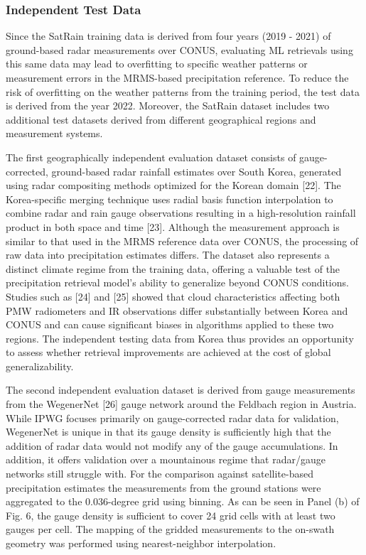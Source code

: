 \documentclass[11pt]{article}
\begin{document}
\subsubsection{Independent Test Data}

Since the SatRain training data is derived from four years (2019 - 2021) of ground-based radar measurements over CONUS, evaluating ML retrievals using this same data may lead to overfitting to specific weather patterns or measurement errors in the MRMS-based precipitation reference. To reduce the risk of overfitting on the weather patterns from the training period, the test data is derived from the year 2022. Moreover, the SatRain dataset includes two additional test datasets derived from different geographical regions and measurement systems.

The first geographically independent evaluation dataset consists of gauge-corrected, ground-based radar rainfall estimates over South Korea, generated using radar compositing methods optimized for the Korean domain [22]. The Korea-specific merging technique uses radial basis function interpolation to combine radar and rain gauge observations resulting in a high-resolution rainfall product in both space and time [23]. Although the measurement approach is similar to that used in the MRMS reference data over CONUS, the processing of raw data into precipitation estimates differs. The dataset also represents a distinct climate regime from the training data, offering a valuable test of the precipitation retrieval model’s ability to generalize beyond CONUS conditions. Studies such as [24] and [25]
 showed that cloud characteristics affecting both PMW radiometers and IR observations differ substantially between Korea and CONUS and can cause significant biases in algorithms applied to these two regions. The independent testing data from Korea thus provides an opportunity to assess whether retrieval improvements are achieved at the cost of global generalizability.

The second independent evaluation dataset is derived from gauge measurements from the WegenerNet [26] gauge network around the Feldbach region in Austria. While IPWG focuses primarily on gauge-corrected radar data for validation, WegenerNet is unique in that its gauge density is sufficiently high that the addition of radar data would not modify any of the gauge accumulations. In addition, it offers validation over a mountainous regime that radar/gauge networks still struggle with. For the comparison against satellite-based precipitation estimates the measurements from the ground stations were aggregated to the 0.036-degree grid using binning. As can be seen in Panel (b) of Fig. 6, the gauge density is sufficient to cover 24 grid cells with at least two gauges per cell. The mapping of the gridded measurements to the on-swath geometry was performed using nearest-neighbor interpolation.
\end{document}
